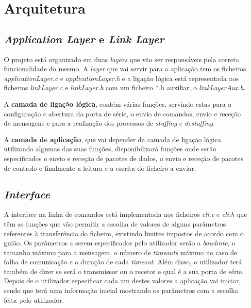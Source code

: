 \documentclass[11pt]{article}
\begin{document}
\section{Arquitetura}

\subsection{\textit{Application Layer} e \textit{Link Layer}}

O projeto está organizado em duas \textit{layers} que vão ser responsáveis pela correta funcionalidade do mesmo. A \textit{layer} que vai servir para a aplicação tem os ficheiros \textit{applicationLayer.c} e \textit{applicationLayer.h} e a ligação lógica está representada nos ficheiros \textit{linkLayer.c} e \textit{linkLayer.h} com um ficheiro *.h auxiliar, o \textit{linkLayerAux.h}.\newline

A \textbf{camada de ligação lógica}, contém várias funções, servindo estas para a configuração e abertura da porta de série, o envio de comandos, envio e receção de mensagens e para a realização dos processos de \textit{stuffing} e \textit{destuffing}.\newline

A \textbf{camada de aplicação}, que vai depender da camada de ligação lógica utilizando algumas das suas funções, disponibilizará funções onde serão especificados o envio e receção de pacotes de dados, o envio e receção de pacotes de controlo e finalmente a leitura e a escrita do ficheiro a enviar. 

\subsection{\textit{Interface}}

A interface na linha de comandos está implementada nos ficheiros \textit{cli.c} e \textit{cli.h} que têm as funções que vão permitir a escolha de valores de alguns parâmetros referentes à transferência do ficheiro, existindo limites impostos de acordo com o guião. 
Os parâmetros a serem especificados pelo utilizador serão a \textit{baudrate}, o tamanho máximo para a mensagem, o número de \textit{timeouts} máximo no caso de falha de comunicação e a duração de cada \textit{timeout}. Além disso, o utilizador terá também de dizer se será o transmissor ou o recetor e qual é a sua porta de série. Depois de o utilizador especificar cada um destes valores a aplicação vai iniciar, sendo que terá uma informação inicial mostrando os parâmetros com a escolha feita pelo utilizador. 
\end{document}
